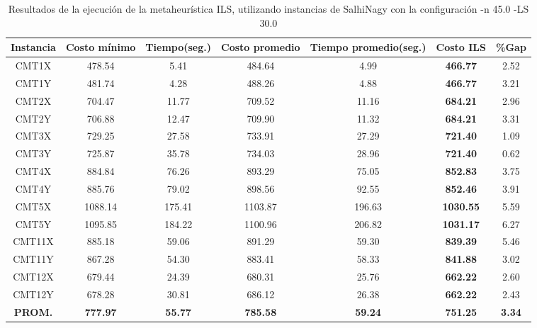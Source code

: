 \begin{table}[ht]
\caption{Resultados de la ejecución de la metaheurística ILS, utilizando instancias de SalhiNagy con la configuración -n 45.0 -LS 30.0}
\centering
\small
\begin{tabular}{c c c c c c c}
\hline\hline
Instancia & Costo mínimo & Tiempo(seg.) & Costo promedio & Tiempo promedio(seg.) & Costo ILS & \%Gap \\ [0.5ex]
\hline
CMT1X & 478.54 & 5.41 & 
484.64 & 4.99 & \bf{466.77} & 
2.52\\CMT1Y & 481.74 & 4.28 & 
488.26 & 4.88 & \bf{466.77} & 
3.21\\CMT2X & 704.47 & 11.77 & 
709.52 & 11.16 & \bf{684.21} & 
2.96\\CMT2Y & 706.88 & 12.47 & 
709.90 & 11.32 & \bf{684.21} & 
3.31\\CMT3X & 729.25 & 27.58 & 
733.91 & 27.29 & \bf{721.40} & 
1.09\\CMT3Y & 725.87 & 35.78 & 
734.03 & 28.96 & \bf{721.40} & 
0.62\\CMT4X & 884.84 & 76.26 & 
893.29 & 75.05 & \bf{852.83} & 
3.75\\CMT4Y & 885.76 & 79.02 & 
898.56 & 92.55 & \bf{852.46} & 
3.91\\CMT5X & 1088.14 & 175.41 & 
1103.87 & 196.63 & \bf{1030.55} & 
5.59\\CMT5Y & 1095.85 & 184.22 & 
1100.96 & 206.82 & \bf{1031.17} & 
6.27\\CMT11X & 885.18 & 59.06 & 
891.29 & 59.30 & \bf{839.39} & 
5.46\\CMT11Y & 867.28 & 54.30 & 
883.41 & 58.33 & \bf{841.88} & 
3.02\\CMT12X & 679.44 & 24.39 & 
680.31 & 25.76 & \bf{662.22} & 
2.60\\CMT12Y & 678.28 & 30.81 & 
686.12 & 26.38 & \bf{662.22} & 
2.43\\\bf{PROM.} & 
\bf{777.97} & \bf{55.77} & \bf{785.58} & \bf{59.24} & \bf{751.25} & \bf{3.34}\\[1ex]\hline
\end{tabular}
\label{table:nonlin}
\end{table} \clearpage

